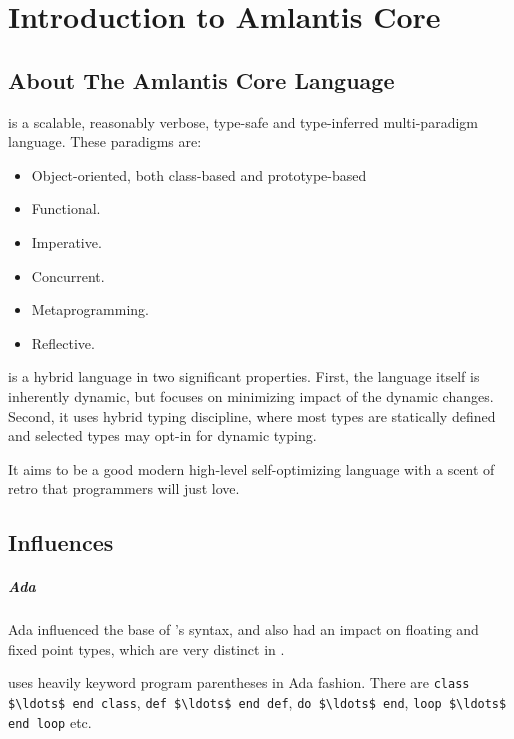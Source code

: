 
\chapter{Introduction to Amlantis Core}

\minitoc

\newpage


\section{About The Amlantis Core Language}

\Aml is a scalable, reasonably verbose, type-safe and type-inferred multi-paradigm language. These paradigms are:
\begin{itemize}
  \item Object-oriented, both class-based and prototype-based
  \item Functional. 
  \item Imperative. 
  \item Concurrent. 
  \item Metaprogramming. 
  \item Reflective. 
\end{itemize}

\Aml is a hybrid language in two significant properties. First, the language itself is inherently dynamic, but focuses on minimizing impact of the dynamic changes. Second, it uses hybrid typing discipline, where most types are statically defined and selected types may opt-in for dynamic typing. 

It aims to be a good modern high-level self-optimizing language with a scent of retro that programmers will just love. 






\section{Influences}

\paragraph{Ada}
Ada influenced the base of \Aml's syntax, and also had an impact on floating and fixed point types, which are very distinct in \Aml. 

\Aml uses heavily keyword program parentheses in Ada fashion. There are \lstinline!class $\ldots$ end class!, \lstinline!def $\ldots$ end def!, \lstinline!do $\ldots$ end!, \lstinline!loop $\ldots$ end loop! etc.

